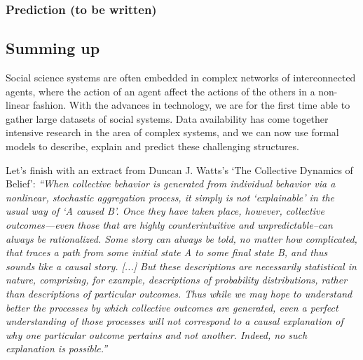
%


\subsubsection{Prediction (to be written)}




\lipsum[1-2]


\subsection{Summing up}
Social science systems are often embedded in complex networks of interconnected agents, 
where the action of an agent affect the actions of the others in a non-linear fashion.
With the advances in technology, 
we are for the first time able to gather large datasets of social systems.
Data availability has come together intensive research in the area of complex systems,
and we can now use formal models to describe, explain and predict these challenging structures.

Let's finish with an extract from Duncan J. Watts's `The Collective Dynamics of Belief': \textit{``When collective behavior is generated from individual behavior via a nonlinear, stochastic aggregation process, it simply is not `explainable' in the usual way of `A caused B'. Once they have taken place, however, collective outcomes—even those that are highly counterintuitive and unpredictable--can always be rationalized. Some story can always be told, no matter how complicated, that traces a path from some initial state A to some final state B, and thus sounds like a causal story.
[...]
But these descriptions are necessarily statistical in nature, comprising, for example, descriptions of probability distributions, rather than descriptions of particular outcomes. 
Thus while we may hope to understand better the processes by which collective outcomes are generated, even a perfect understanding of those processes will not correspond to a causal explanation of why one particular outcome pertains and not another. Indeed, no such explanation is possible.''}



